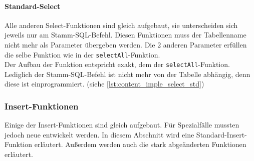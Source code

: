 

\paragraph{Standard-Select\\}
Alle anderen Select-Funktionen sind gleich aufgebaut, sie unterscheiden sich jeweils nur am Stamm-SQL-Befehl. Diesen Funktionen muss der Tabellenname nicht mehr als Parameter übergeben werden. Die 2 anderen Parameter erfüllen die selbe Funktion wie in der \texttt{selectAll}-Funktion.\\
Der Aufbau der Funktion entspricht exakt, dem der \texttt{selectAll}-Funktion. Lediglich der Stamm-SQL-Befehl ist nicht mehr von der Tabelle abhängig, denn diese ist einprogrammiert. (siehe \autoref{lst:content_imple_select_std})



\subsubsection{Insert-Funktionen}
Einige der Insert-Funktionen sind gleich aufgebaut. Für Spezialfälle mussten jedoch neue entwickelt werden. In diesem Abschnitt wird eine Standard-Insert-Funktion erläutert. Außerdem werden auch die stark abgeänderten Funktionen erläutert.


